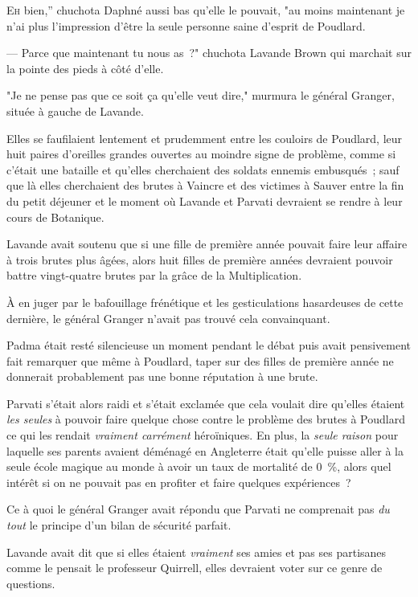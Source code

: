 
\lettrine[ante=<<~]{E}{h} bien,” chuchota Daphné aussi bas qu'elle le pouvait, "au moins maintenant je n'ai plus l'impression d'être la seule personne saine d'esprit de Poudlard.

--- Parce que maintenant tu nous as~?" chuchota Lavande Brown qui marchait sur la pointe des pieds à côté d'elle.

"Je ne pense pas que ce soit ça qu'elle veut dire," murmura le général Granger, située à gauche de Lavande.

Elles se faufilaient lentement et prudemment entre les couloirs de Poudlard, leur huit paires d'oreilles grandes ouvertes au moindre signe de problème, comme si c'était une bataille et qu'elles cherchaient des soldats ennemis embusqués~; sauf que là elles cherchaient des brutes à Vaincre et des victimes à Sauver entre la fin du petit déjeuner et le moment où Lavande et Parvati devraient se rendre à leur cours de Botanique.

Lavande avait soutenu que si une fille de première année pouvait faire leur affaire à trois brutes plus âgées, alors huit filles de première années devraient pouvoir battre vingt-quatre brutes par la grâce de la Multiplication.

À en juger par le bafouillage frénétique et les gesticulations hasardeuses de cette dernière, le général Granger n'avait pas trouvé cela convainquant.

Padma était resté silencieuse un moment pendant le débat puis avait pensivement fait remarquer que même à Poudlard, taper sur des filles de première année ne donnerait probablement pas une bonne réputation à une brute.

Parvati s'était alors raidi et s'était exclamée que cela voulait dire qu'elles étaient \emph{les seules} à pouvoir faire quelque chose contre le problème des brutes à Poudlard ce qui les rendait \emph{vraiment carrément} héroïniques. En plus, la \emph{seule raison} pour laquelle ses parents avaient déménagé en Angleterre était qu'elle puisse aller à la seule école magique au monde à avoir un taux de mortalité de 0~\%, alors quel intérêt si on ne pouvait pas en profiter et faire quelques expériences~?

Ce à quoi le général Granger avait répondu que Parvati ne comprenait pas \emph{du tout} le principe d'un bilan de sécurité parfait.

Lavande avait dit que si elles étaient \emph{vraiment} ses amies et pas ses partisanes comme le pensait le professeur Quirrell, elles devraient voter sur ce genre de questions.


